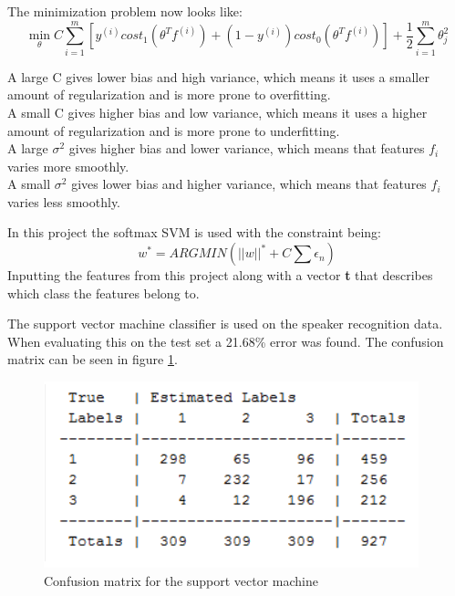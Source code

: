 The minimization problem now looks like:
\begin{equation}
\min_{\theta}C \sum_{i=1}^{m}
\left[ y^{(i)}cost_1(\theta^Tf^{(i)})+(1-y^{(i)})cost_0(\theta^Tf^{(i)}) \right]
+ \frac{1}{2}\sum_{i=1}^{m}\theta^2_j
\end{equation}

A large C gives lower bias and high variance, which means it uses a smaller amount of regularization and is more prone to overfitting. \\
A small C gives higher bias and low variance, which means it uses a higher amount of regularization and is more prone to underfitting. \\
A large $\sigma^2$ gives higher bias and lower variance, which means that features $f_i$ varies more smoothly. \\
A small $\sigma^2$ gives lower bias and higher variance, which means that features $f_i$ varies less smoothly.


In this project the softmax SVM is used with the constraint being:
\begin{equation}
w^* = ARG MIN (||w||^* + C \sum \epsilon_n)
\end{equation}
Inputting the features from this project along with a vector \textbf{t} that describes which class the features belong to.

The support vector machine classifier is used on the speaker recognition data. When evaluating this on the test set a 21.68\% error was found. The confusion matrix can be seen in figure \ref{fig:conmatsvm}. 
\begin{figure}[H]
\centering
\includegraphics[scale=.75]{billeder/conmatsvm}
\caption{Confusion matrix for the support vector machine }
\label{fig:conmatsvm}
\end{figure}




